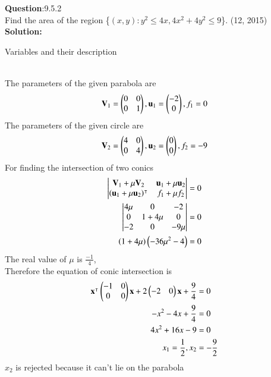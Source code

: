 \documentclass[journal]{IEEEtran}
\begin{document}
\textbf{Question}:9.5.2\\
Find the area of the region \{$(x, y) : y^2 \leq 4x, 4x^2 + 4y^2 \leq 9$\}. \hfill(12, 2015)
\\
\textbf{Solution:}
\renewcommand{\tablename}{Table 9.5.2.1}
\begin{table}[h!]
  \centering
  
  \caption{Variables and their description}
\end{table}
\\
The parameters of the given parabola are
\begin{align}
\textbf{V}_1 = \begin{pmatrix}0 & 0 \\0 & 1\end{pmatrix},\mathbf{u}_1 = \begin{pmatrix}-2 \\ 0\end{pmatrix},f_1 = 0 
\end{align}
The parameters of the given circle are
\begin{align}
  \textbf{V}_2 = \begin{pmatrix}4 & 0 \\0 & 4\end{pmatrix},\mathbf{u}_2 = \begin{pmatrix}0 \\ 0\end{pmatrix},f_2 = -9 
\end{align}
For finding the intersection of two conics
\begin{align}
    \left|\begin{matrix}
        \textbf{V}_1 + \mu\textbf{V}_2 & \mathbf{u}_1 + \mu\mathbf{u}_2 \\ \left(\mathbf{u}_1 + \mu\mathbf{u}_2\right)^\intercal & f_1 + \mu f_2    \end{matrix} \right| & = 0 \\
   \left|\begin{matrix}
       4\mu & 0 & -2 \\ 0 & 1 + 4\mu & 0 \\ -2 & 0 & -9\mu
   \end{matrix} \right| & = 0 \\
   \left(1 + 4\mu\right)\left(-36\mu^2 - 4\right) & = 0
    \end{align}
The real value of $\mu$ is $\frac{-1}{4}$, \\
Therefore the equation of conic intersection is 
\begin{align}
   \mathbf{x}^\intercal\begin{pmatrix}-1 & 0 \\0 & 0\end{pmatrix}\mathbf{x} + 2\begin{pmatrix}-2 & 0\end{pmatrix}\mathbf{x} + \frac{9}{4} & = 0 \\
   -x^2 - 4x + \frac{9}{4} & = 0 \\
   4x^2 + 16x - 9 & = 0 \\
   x_1 = \frac{1}{2}, x_2 & = -\frac{9}{2}
\end{align}
$x_2$ is rejected because it can't lie on the parabola \\
\end{document}
